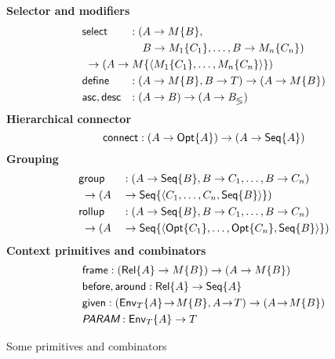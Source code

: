 \begin{table}
\begin{framed}
    \textbf{Selector and modifiers}
    \begin{alignat*}{2}
        & \Select & : (& A \to \Wrap{M}{B}, \\
        & && B \to \Wrap{M_1}{C_1}, \ldots, B \to \Wrap{M_n}{C_n}) \\
        & \;\to (A \to \Wrap{M}{\Tuple{\Wrap{M_1}{C_1}, \ldots, \Wrap{M_n}{C_n}}})\hidewidth && \\
        & \Define & : (& A \to \Wrap{M}{B}, B \to T) \to (A \to \Wrap{M}{B}) \\
        & \Asc, \Desc & : (& A \to B) \to (A \to B_\lessgtr)
    \end{alignat*}
    \textbf{Hierarchical connector}
    \begin{equation*}
        \mathsf{connect} : (A \to \mathsf{Opt}{\left\{A\right\}}) \to (A \to \mathsf{Seq}{\left\{A\right\}})
    \end{equation*}
    \textbf{Grouping}
    \begin{alignat*}{2}
        & \mathsf{group} && : ( A \to \mathsf{Seq}{\left\{B\right\}}, B \to C_1, \ldots, B \to C_n) \\
        & \;\to (A && \to \mathsf{Seq}{\left\{\langle C_1, \ldots, C_n, \mathsf{Seq}{\left\{B\right\}} \rangle\right\}}) \\
        & \mathsf{rollup} && : ( A \to \mathsf{Seq}{\left\{B\right\}}, B \to C_1, \ldots, B \to C_n) \\
        & \;\to (A && \to \mathsf{Seq}{\left\{\langle \mathsf{Opt}{\left\{C_1\right\}}, \ldots, \mathsf{Opt}{\left\{C_n\right\}}, \mathsf{Seq}{\left\{B\right\}} \rangle\right\}})
    \end{alignat*}
    \textbf{Context primitives and combinators}
    \begin{align*}
        & \mathsf{frame} : (\mathsf{Rel}{\left\{A\right\}} \to M{\left\{B\right\}}) \to (A \to M{\left\{B\right\}}) \\
        & \mathsf{before}, \mathsf{around} : \mathsf{Rel}{\left\{A\right\}} \to \mathsf{Seq}{\left\{A\right\}} \\
        & \mathsf{given} : (\mathsf{Env}_{T}{\left\{A\right\}} \!\to\! M{\left\{B\right\}}, A \!\to\! T) \to (A \!\to\! M{\left\{B\right\}}) \\
        & \textit{\textsf{PARAM}} : \mathsf{Env}_{T}{\left\{A\right\}} \to T
    \end{align*}
    \vspace*{-\bigskipamount}
    \end{framed}
    \caption{Some primitives and combinators}
    \label{tab:common-combinators}
\end{table}

